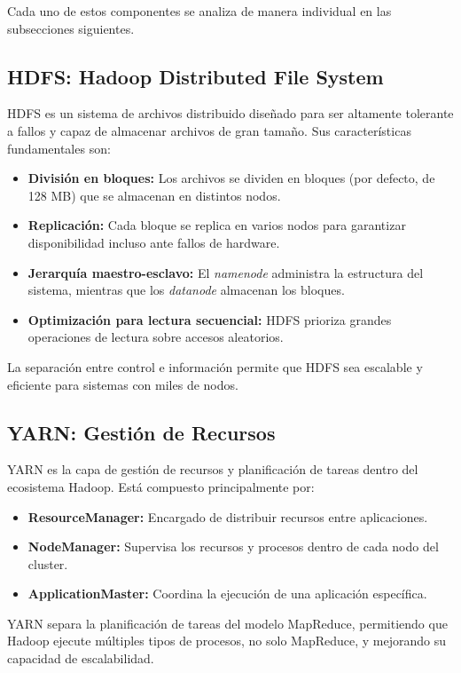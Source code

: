 Cada uno de estos componentes se analiza de manera individual en las subsecciones siguientes.

\subsection{HDFS: Hadoop Distributed File System}

HDFS es un sistema de archivos distribuido diseñado para ser altamente tolerante a fallos y capaz de almacenar archivos de gran tamaño. Sus características fundamentales son:

\begin{itemize}
    \item \textbf{División en bloques:} Los archivos se dividen en bloques (por defecto, de 128 MB) que se almacenan en distintos nodos.
    \item \textbf{Replicación:} Cada bloque se replica en varios nodos para garantizar disponibilidad incluso ante fallos de hardware.
    \item \textbf{Jerarquía maestro-esclavo:} El \textit{namenode} administra la estructura del sistema, mientras que los \textit{datanode} almacenan los bloques.
    \item \textbf{Optimización para lectura secuencial:} HDFS prioriza grandes operaciones de lectura sobre accesos aleatorios.
\end{itemize}

La separación entre control e información permite que HDFS sea escalable y eficiente para sistemas con miles de nodos.

\subsection{YARN: Gestión de Recursos}

YARN es la capa de gestión de recursos y planificación de tareas dentro del ecosistema Hadoop. Está compuesto principalmente por:

\begin{itemize}
    \item \textbf{ResourceManager:} Encargado de distribuir recursos entre aplicaciones.
    \item \textbf{NodeManager:} Supervisa los recursos y procesos dentro de cada nodo del cluster.
    \item \textbf{ApplicationMaster:} Coordina la ejecución de una aplicación específica.
\end{itemize}

YARN separa la planificación de tareas del modelo MapReduce, permitiendo que Hadoop ejecute múltiples tipos de procesos, no solo MapReduce, y mejorando su capacidad de escalabilidad.

